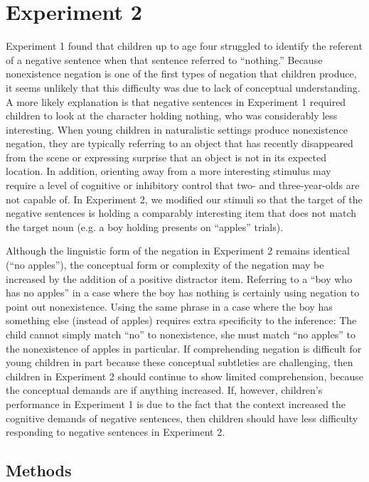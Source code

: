 \documentclass[man]{apa2}
\begin{document}
\section{Experiment 2}

Experiment 1 found that children up to age four struggled to identify the referent of a negative sentence when that sentence referred to ``nothing.''  Because nonexistence negation is one of the first types of negation that children produce, it seems unlikely that this difficulty was due to lack of conceptual understanding.  A more likely explanation is that negative sentences in Experiment 1 required children to look at the character holding nothing, who was considerably less interesting.  When young children in naturalistic settings produce nonexistence negation, they are typically referring to an object that has recently disappeared from the scene or expressing surprise that an object is not in its expected location.  In addition, orienting away from a more interesting stimulus may require a level of cognitive or inhibitory control that two- and three-year-olds are not capable of.  In Experiment 2, we modified our stimuli so that the target of the negative sentences is holding a comparably interesting item that does not match the target noun (e.g. a boy holding presents on ``apples'' trials).  

Although the linguistic form of the negation in Experiment 2 remains identical (``no apples''), the conceptual form or complexity of the negation may be increased by the addition of a positive distractor item. Referring to a ``boy who has no apples'' in a case where the boy has nothing is certainly using negation to point out nonexistence. Using the same phrase in a case where the boy has something else (instead of apples) requires extra specificity to the inference: The child cannot simply match ``no'' to nonexistence, she must match ``no apples'' to the nonexistence of apples in particular. If comprehending negation is difficult for young children in part because these conceptual subtleties are challenging, then children in Experiment 2 should continue to show limited comprehension, because the conceptual demands are if anything increased.  If, however, children's performance in Experiment 1 is due to the fact that the context increased the cognitive demands of negative sentences, then children should have less difficulty responding to negative sentences in Experiment 2.

\subsection{Methods}
\end{document}
